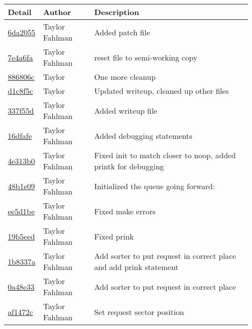 \begin{tabular}{l l l}\textbf{Detail} & \textbf{Author} & \textbf{Description}\\\hline
\href{git@github.com:fahlmant/cs444/commit/6da20559bf2fd5648a71e263be1fcddb68cb1786}{6da2055} & Taylor Fahlman & Added patch file\\\hline
\href{git@github.com:fahlmant/cs444/commit/7e4a6fad9eede1051a7ebc5db14bd3f360077816}{7e4a6fa} & Taylor Fahlman & reset file to semi-working copy\\\hline
\href{git@github.com:fahlmant/cs444/commit/886806cc8700041836984270d8457cb305283982}{886806c} & Taylor & One more cleanup\\\hline
\href{git@github.com:fahlmant/cs444/commit/d1c8f5c0597b0374c8fa150baf8654161f50eb83}{d1c8f5c} & Taylor & Updated writeup, cleaned up other files\\\hline
\href{git@github.com:fahlmant/cs444/commit/337f55d1a7a77b5840ab7cd55d3b98e6f8a4ea61}{337f55d} & Taylor Fahlman & Added writeup file\\\hline
\href{git@github.com:fahlmant/cs444/commit/16dfafe2b2ddaa55c00dc6f13d1624f5f348abdc}{16dfafe} & Taylor Fahlman & Added debugging statements\\\hline
\href{git@github.com:fahlmant/cs444/commit/4e313b07a7ce52c2eeb15e77780b0344fd58e776}{4e313b0} & Taylor Fahlman & Fixed init to match closer to noop, added printk for debugging\\\hline
\href{git@github.com:fahlmant/cs444/commit/48b1e091f6f8445fc355268ded9d2ab085f38217}{48b1e09} & Taylor Fahlman & Initialized the queue going forward:\\\hline
\href{git@github.com:fahlmant/cs444/commit/ee5d1be765a4359e795c1cfab79f45e7157dc427}{ee5d1be} & Taylor Fahlman & Fixed make errors\\\hline
\href{git@github.com:fahlmant/cs444/commit/19b5eed5fce8f0988d6de8e32433e71ec722f401}{19b5eed} & Taylor Fahlman & Fixed prink\\\hline
\href{git@github.com:fahlmant/cs444/commit/1b8337adbfd556c19331c13e47fdf30f6be4aa2c}{1b8337a} & Taylor Fahlman & Add sorter to put request in correct place and add prink statement\\\hline
\href{git@github.com:fahlmant/cs444/commit/0a48e33e7e336bcfa08225cb01f3df0fcaaed1f8}{0a48e33} & Taylor Fahlman & Add sorter to put request in correct place\\\hline
\href{git@github.com:fahlmant/cs444/commit/af1472c36acd59ba67588633806bf0893cfe8b8b}{af1472c} & Taylor Fahlman & Set request sector position\\\hline

\end{tabular}
